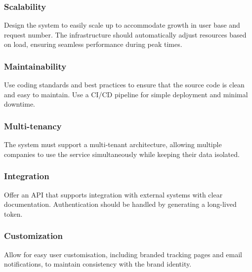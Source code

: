 \subsubsection{Scalability}
Design the system to easily scale up to accommodate growth in user base and request number.
The infrastructure should automatically adjust resources based on load, ensuring seamless performance during peak times.

\subsubsection{Maintainability}
Use coding standards and best practices to ensure that the source code is clean and easy to maintain.
Use a \ac{CI}/\ac{CD} pipeline for simple deployment and minimal downtime. 

\subsubsection{Multi-tenancy}
The system must support a multi-tenant architecture, allowing multiple companies to use the service simultaneously while keeping their data isolated.

\subsubsection{Integration}
Offer an API that supports integration with external systems with clear documentation.
Authentication should be handled by generating a long-lived token.

\subsubsection{Customization}
Allow for easy user customisation, including branded tracking pages and email notifications, to maintain consistency with the brand identity.




